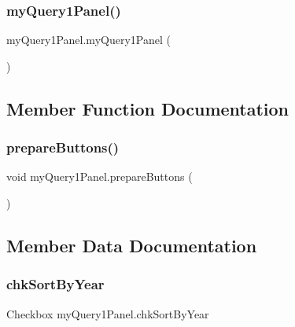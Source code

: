 \subsubsection{\texorpdfstring{my\+Query1\+Panel()}{myQuery1Panel()}}
{\footnotesize\ttfamily my\+Query1\+Panel.\+my\+Query1\+Panel (\begin{DoxyParamCaption}{ }\end{DoxyParamCaption})}



\subsection{Member Function Documentation}
\hypertarget{classmy_query1_panel_a0a640aa15c5356a9eab718201267a245}{}\label{classmy_query1_panel_a0a640aa15c5356a9eab718201267a245} 
\subsubsection{\texorpdfstring{prepare\+Buttons()}{prepareButtons()}}
{\footnotesize\ttfamily void my\+Query1\+Panel.\+prepare\+Buttons (\begin{DoxyParamCaption}{ }\end{DoxyParamCaption})}



\subsection{Member Data Documentation}
\hypertarget{classmy_query1_panel_a112a1c15d47ccd9a16a3d5d4e7211809}{}\label{classmy_query1_panel_a112a1c15d47ccd9a16a3d5d4e7211809} 
\subsubsection{\texorpdfstring{chk\+Sort\+By\+Year}{chkSortByYear}}
{\footnotesize\ttfamily Checkbox my\+Query1\+Panel.\+chk\+Sort\+By\+Year\hspace{0.3cm}{\ttfamily [protected]}}

\hypertarget{classmy_query1_panel_aba2fe28e793bc84fe789e98c7b89e065}{}\label{classmy_query1_panel_aba2fe28e793bc84fe789e98c7b89e065} 
